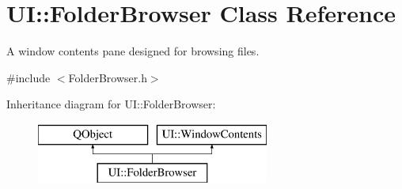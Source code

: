 \hypertarget{class_u_i_1_1_folder_browser}{\section{U\-I\-:\-:Folder\-Browser Class Reference}
\label{class_u_i_1_1_folder_browser}
}


A window contents pane designed for browsing files.  




{\ttfamily \#include $<$Folder\-Browser.\-h$>$}

Inheritance diagram for U\-I\-:\-:Folder\-Browser\-:\begin{figure}[H]
\begin{center}
\leavevmode
\includegraphics[height=2.000000cm]{class_u_i_1_1_folder_browser}
\end{center}
\end{figure}
